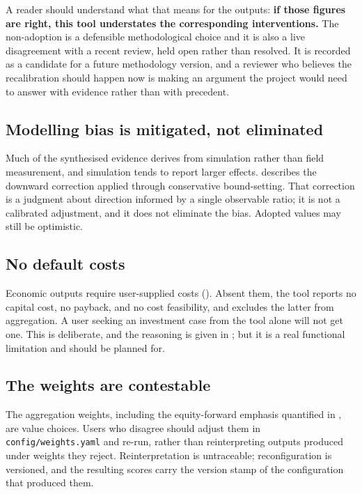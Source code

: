 A reader should understand what that means for the outputs: \textbf{if those
figures are right, this tool understates the corresponding interventions.} The
non-adoption is a defensible methodological choice and it is also a live
disagreement with a recent review, held open rather than resolved. It is
recorded as a candidate for a future methodology version, and a reviewer who
believes the recalibration should happen now is making an argument the project
would need to answer with evidence rather than with precedent.

\subsection{Modelling bias is mitigated, not eliminated}

Much of the synthesised evidence derives from simulation rather than field
measurement, and simulation tends to report larger effects.
 describes the downward correction applied through
conservative bound-setting. That correction is a judgment about direction
informed by a single observable ratio; it is not a calibrated adjustment, and
it does not eliminate the bias. Adopted values may still be optimistic.

\subsection{No default costs}

Economic outputs require user-supplied costs (). Absent them,
the tool reports no capital cost, no payback, and no cost feasibility, and
excludes the latter from aggregation. A user seeking an investment case from
the tool alone will not get one. This is deliberate, and the reasoning is given
in ; but it is a real functional limitation and should be
planned for.

\subsection{The weights are contestable}

The aggregation weights, including the equity-forward emphasis quantified in
, are value choices. Users who disagree should
adjust them in \texttt{config/weights.yaml} and re-run, rather than
reinterpreting outputs produced under weights they reject. Reinterpretation is
untraceable; reconfiguration is versioned, and the resulting scores carry the
version stamp of the configuration that produced them.


